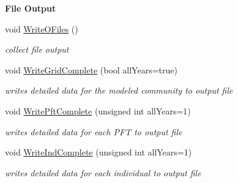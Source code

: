 \begin{Indent}\textbf{ File Output}\par
\begin{DoxyCompactItemize}
\item 
void \mbox{\hyperlink{class_c_envir_a6360f8dae599cd805953dc8b62983d73}{Write\+O\+Files}} ()
\begin{DoxyCompactList}\small\item\em collect file output \end{DoxyCompactList}\item 
void \mbox{\hyperlink{class_c_envir_a627610c9f063c305c7f945ed4dfad005}{Write\+Grid\+Complete}} (bool all\+Years=true)
\begin{DoxyCompactList}\small\item\em writes detailed data for the modeled community to output file \end{DoxyCompactList}\item 
void \mbox{\hyperlink{class_c_envir_ab95d6a59533857595e6a02fa25e825f3}{Write\+Pft\+Complete}} (unsigned int all\+Years=1)
\begin{DoxyCompactList}\small\item\em writes detailed data for each P\+FT to output file \end{DoxyCompactList}\item 
void \mbox{\hyperlink{class_c_envir_ac6a13eb1c2df8737cc912fd7b33aa103}{Write\+Ind\+Complete}} (unsigned int all\+Years=1)
\begin{DoxyCompactList}\small\item\em writes detailed data for each individual to output file \end{DoxyCompactList}\end{DoxyCompactItemize}
\end{Indent}

